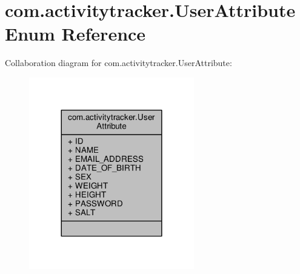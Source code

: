 \hypertarget{enumcom_1_1activitytracker_1_1_user_attribute}{}\section{com.\+activitytracker.\+User\+Attribute Enum Reference}
\label{enumcom_1_1activitytracker_1_1_user_attribute}


Collaboration diagram for com.\+activitytracker.\+User\+Attribute\+:
\nopagebreak
\begin{figure}[H]
\begin{center}
\leavevmode
\includegraphics[width=204pt]{enumcom_1_1activitytracker_1_1_user_attribute__coll__graph}
\end{center}
\end{figure}
